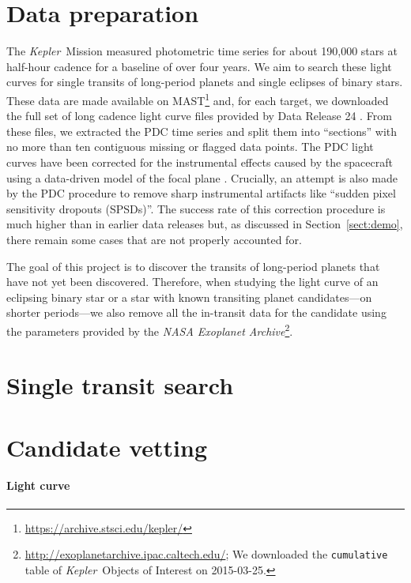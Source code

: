 \documentclass[12pt,preprint]{aastex}
\newcommand{\project}[1]{\textsl{#1}}
\newcommand{\kepler}{\project{Kepler}}
\newcommand{\sectionname}{Section}
\newcommand{\sectref}[1]{\ref{sect:#1}}
\newcommand{\Sect}[1]{\sectionname~\sectref{#1}}
\newcommand{\sect}[1]{\Sect{#1}}
\newcommand{\sectlabel}[1]{\label{sect:#1}}
\begin{document}
\section{Data preparation}\sectlabel{data}

The \kepler\ Mission measured photometric time series for about 190,000 stars
at half-hour cadence for a baseline of over four years.
We aim to search these light curves for single transits of long-period planets
and single eclipses of binary stars.
These data are made available on
MAST\footnote{\url{https://archive.stsci.edu/kepler/}} and, for each target,
we downloaded the full set of long cadence light curve files provided by Data
Release 24 \citep{Thompson:2015}.
From these files, we extracted the PDC time series and split them into
``sections'' with no more than ten contiguous missing or flagged data points.
The PDC light curves have been corrected for the instrumental effects caused
by the spacecraft using a data-driven model of the focal plane
\citep{Stumpe:2012, Smith:2012}.
Crucially, an attempt is also made by the PDC procedure to remove sharp
instrumental artifacts like ``sudden pixel sensitivity dropouts (SPSDs)''.
The success rate of this correction procedure is much higher than in earlier
data releases but, as discussed in \sect{demo}, there remain some cases that
are not properly accounted for.

The goal of this project is to discover the transits of long-period planets
that have not yet been discovered.
Therefore, when studying the light curve of an eclipsing binary star or a star
with known transiting planet candidates---on shorter periods---we also remove
all the in-transit data for the candidate using the parameters provided by the
\project{NASA Exoplanet
Archive}\footnote{\url{http://exoplanetarchive.ipac.caltech.edu/}; We
downloaded the \texttt{cumulative} table of \kepler\ Objects of Interest on
2015-03-25.}.


\section{Single transit search}


\section{Candidate vetting}

\paragraph{Light curve}
\end{document}
